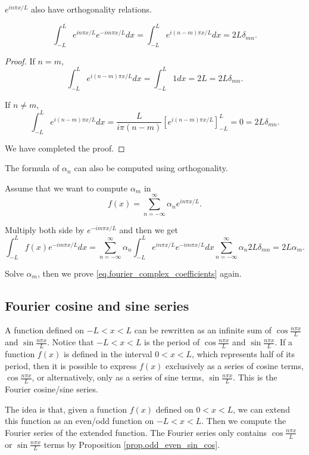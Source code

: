 $e^{i n \pi x / L}$ also have orthogonality relations.

\begin{theorem}
$$
\int_{-L}^L e^{i n \pi x / L} e^{-i m \pi x / L} d x=\int_{-L}^L e^{i(n-m) \pi x / L} d x=2 L \delta_{m n} .
$$
\end{theorem}
\begin{proof}
If $n = m$, 
$$
\int_{-L}^L e^{i(n-m) \pi x / L} d x = \int_{-L}^L 1 d x = 2L = 2L\delta_{m n}.
$$

If $n \neq m$, 
$$
\int_{-L}^L e^{i(n-m) \pi x / L} d x = \frac{L}{i\pi(n-m)}\left[e^{i(n-m) \pi x / L}\right]^{L}_{-L} = 0 = 2L\delta_{m n}.
$$

We have completed the proof.
\end{proof}

The formula of $\alpha_n$ can also be computed using orthogonality.

Assume that we want to compute $\alpha_m$ in 
$$
f(x)=\sum_{n=-\infty}^{\infty} \alpha_n e^{i n \pi x / L}.
$$

Multiply both side by $e^{-i m \pi x / L}$ and then we get
$$
\int_{-L}^L f(x) e^{-i m \pi x / L} d x=\sum_{n=-\infty}^{\infty} \alpha_n \int_{-L}^Le^{i n \pi x / L} e^{- i m \pi x / L} dx \sum_{n=-\infty}^{\infty} \alpha_n 2L \delta_{m n} = 2L\alpha_m.
$$

Solve $\alpha_m$, then we prove \eqref{eq.fourier_complex_coefficients} again.

\subsection{Fourier cosine and sine series}\label{sec.fourier_cosine_sine}

A function defined on $-L<x<L$ can be rewritten as an infinite sum of $\cos \frac{n \pi x}{L}$ and $\sin \frac{n \pi x}{L}$. Notice that $-L<x<L$ is the period of $\cos \frac{n \pi x}{L}$ and $\sin \frac{n \pi x}{L}$. If a function $f(x)$ is defined in the interval $0 < x < L$, which represents half of its period, then it is possible to express $f(x)$ exclusively as a series of cosine terms, $\cos \frac{n \pi x}{L}$, or alternatively, only as a series of sine terms, $\sin \frac{n \pi x}{L}$. This is the Fourier cosine/sine series.

The idea is that, given a function $f(x)$ defined on $0 < x < L$, we can extend this function as an even/odd function on $-L < x < L$. Then we compute the Fourier series of the extended function. The Fourier series only contains $\cos \frac{n \pi x}{L}$ or $\sin \frac{n \pi x}{L}$ terms by Proposition \ref{prop.odd_even_sin_cos}.

